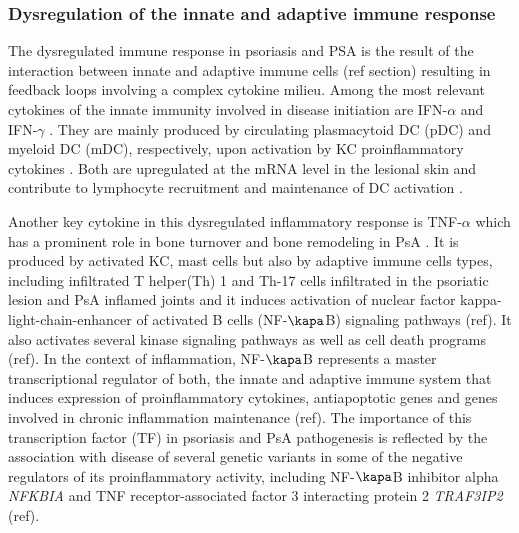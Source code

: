 \subsubsection{Dysregulation of the innate and adaptive immune response}
The dysregulated  immune response in psoriasis and PSA is the result of the interaction between innate and adaptive immune cells (ref section) resulting in feedback loops involving a complex cytokine milieu. Among the most relevant cytokines of the innate immunity involved in disease initiation are IFN-$\alpha$ and IFN-$\gamma$ \parencite{Leanne2009}. They are mainly produced by circulating plasmacytoid DC (pDC) and myeloid DC (mDC), respectively, upon activation by KC proinflammatory cytokines \parencite{Perera2012}. Both are upregulated at the mRNA level in the lesional skin and contribute to lymphocyte recruitment and maintenance of DC activation \parencite{Schmid1994}. 

Another key cytokine in this dysregulated inflammatory response is TNF-$\alpha$ which has a prominent role in bone turnover and bone remodeling in PsA \parencite{Mensah2008}. It is produced by activated KC, mast cells but also by adaptive immune cells types, including infiltrated T helper(Th) 1 and Th-17 cells infiltrated in the psoriatic lesion and PsA inflamed joints \parencite{Perera2012} and it induces activation of nuclear factor kappa-light-chain-enhancer of activated B cells (NF-$\kapa$B) signaling pathways (ref). It also activates several kinase signaling pathways as well as cell death programs (ref). In the context of inflammation, NF-$\kapa$B represents a master transcriptional regulator of both, the innate and adaptive immune system that induces expression of proinflammatory cytokines, antiapoptotic genes and genes involved in chronic inflammation maintenance (ref). The importance of this transcription factor (TF) in psoriasis and PsA pathogenesis is reflected by the association with disease of several genetic variants in some of the negative regulators of its proinflammatory activity, including NF-$\kapa$B inhibitor alpha \textit{NFKBIA} and TNF receptor-associated factor 3 interacting protein 2 \textit{TRAF3IP2} (ref).
 
